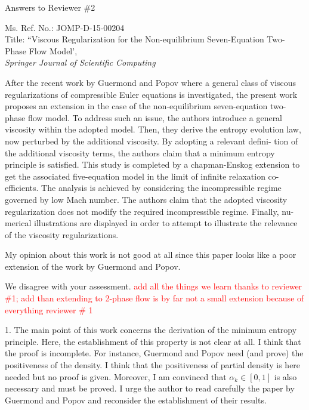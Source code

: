 \documentclass{article}
\newcommand{\tcr}[1]{\textcolor{red}{#1}}
\begin{document}

\begin{center}
{ \Large Answers to Reviewer \#2}
\end{center}

\bigskip

\noindent Ms. Ref. No.: JOMP-D-15-00204\\
Title: ``Viscous Regularization for the Non-equilibrium Seven-Equation Two-Phase Flow Model', \\
{\it Springer Journal of Scientific Computing}\\

\bigskip
\bigskip

{\color{blue}
After the recent work by Guermond and Popov where a general class of viscous
regularizations of compressible Euler equations is investigated, the present work
proposes an extension in the case of the non-equilibrium seven-equation two-
phase flow model. To address such an issue, the authors introduce a general
viscosity within the adopted model. Then, they derive the entropy evolution
law, now perturbed by the additional viscosity. By adopting a relevant defini-
tion of the additional viscosity terms, the authors claim that a minimum entropy
principle is satisfied. This study is completed by a chapman-Enskog extension
to get the associated five-equation model in the limit of infinite relaxation co-
efficients. The analysis is achieved by considering the incompressible regime
governed by low Mach number. The authors claim that the adopted viscosity
regularization does not modify the required incompressible regime. Finally, nu-
merical illustrations are displayed in order to attempt to illustrate the relevance
of the viscosity regularizations.

My opinion about this work is not good at all since this paper looks like a poor
extension of the work by Guermond and Popov.}

We disagree with your assessment. \tcr{add all the things we learn thanks to reviewer \#1; 
add than extending to 2-phase flow is by far not a small extension because of everything
reviewer \# 1}
\bigskip




{\color{blue}
1. The main point of this work concerns the derivation of the minimum
entropy principle. Here, the establishment of this property is not clear
at all. I think that the proof is incomplete. For instance, Guermond
and Popov need (and prove) the positiveness of the density. I think that
the positiveness of partial density is here needed but no proof is given.
Moreover, I am convinced that $\alpha_k \in [0, 1]$ is also necessary and must be
proved. I urge the author to read carefully the paper by Guermond and
Popov and reconsider the establishment of their results.}
\end{document}
